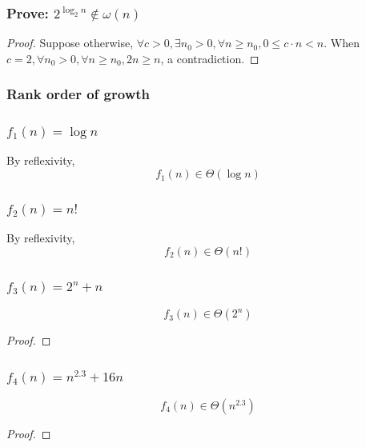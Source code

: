 \documentclass[9pt]{extarticle}
\begin{document}
\subsubsection*{Prove: $2^{\log_2n} \notin \omega(n)$}
\begin{proof}
    Suppose otherwise, $\forall c > 0, \exists n_0 > 0, \forall n \geq n_0, 0 \leq c\cdot n < n$. When $c = 2, \forall n_0 > 0, \forall n \geq n_0, 2n \geq n$, a contradiction.
\end{proof}

\subsubsection*{Rank order of growth}
\subsubsection*{$f_1(n) = \log n$}
By reflexivity, 
\[f_1(n) \in \Theta(\log n)\]
\subsubsection*{$f_2(n) = n!$}
By reflexivity, 
\[f_2(n) \in \Theta(n!)\]
\subsubsection*{$f_3(n) = 2^n + n$}
\[f_3(n) \in \Theta(2^n)\]
\begin{proof}
    
\end{proof}
\subsubsection*{$f_4(n) = n^{2.3} + 16n$}
\[f_4(n) \in \Theta(n^{2.3})\]
\begin{proof}
    
\end{proof}
\end{document}
